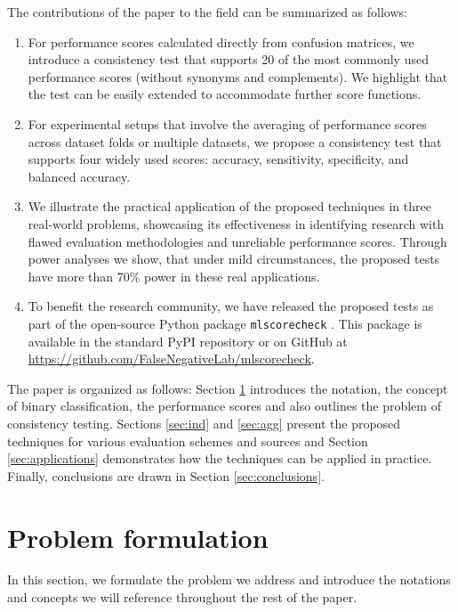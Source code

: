 \documentclass[3p, times]{elsarticle}
\begin{document}
The contributions of the paper to the field can be summarized as follows:
\begin{enumerate}
\item For performance scores calculated directly from confusion matrices, we introduce a consistency test that supports 20 of the most commonly used performance scores (without synonyms and complements). We highlight that the test can be easily extended to accommodate further score functions.
\item For experimental setups that involve the averaging of performance scores across dataset folds or multiple datasets, we propose a consistency test that supports four widely used scores: accuracy, sensitivity, specificity, and balanced accuracy.
\item We illustrate the practical application of the proposed techniques in three real-world problems, showcasing its effectiveness in identifying research with flawed evaluation methodologies and unreliable performance scores. {\color{blue} Through power analyses we show, that under mild circumstances, the proposed tests have more than 70\% power in these real applications.}
\item To benefit the research community, we have released the proposed tests as part of the open-source Python package \verb|mlscorecheck| \cite{mlscorecheck}. This package is available in the standard PyPI repository or on GitHub at \url{https://github.com/FalseNegativeLab/mlscorecheck}.
\end{enumerate}

The paper is organized as follows: Section \ref{sec:problem} introduces the notation, the concept of binary classification, the performance scores and also outlines the problem of consistency testing. Sections \ref{sec:ind} and \ref{sec:agg} present the proposed techniques for various evaluation schemes and sources and Section \ref{sec:applications} demonstrates how the techniques can be applied in practice. Finally, conclusions are drawn in Section \ref{sec:conclusions}.

\section{Problem formulation}
\label{sec:problem}

In this section, we formulate the problem we address and introduce the notations and concepts we will reference throughout the rest of the paper.
\end{document}
